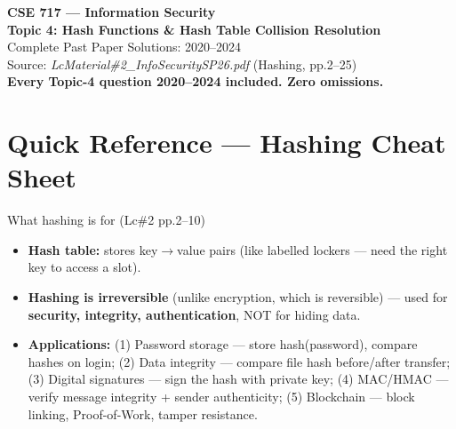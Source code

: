 \documentclass[12pt,a4paper]{article}
\begin{document}
\begin{center}
{\LARGE\bfseries\color{folblue} CSE 717 --- Information Security}\\[4pt]
{\large\bfseries Topic 4: Hash Functions \& Hash Table Collision Resolution}\\[2pt]
{\large Complete Past Paper Solutions: 2020--2024}\\[6pt]
{\normalsize Source: \textit{LcMaterial\#2\_InfoSecuritySP26.pdf} (Hashing, pp.2--25)}\\[2pt]
{\normalsize\color{darkred}\textbf{Every Topic-4 question 2020--2024 included. Zero omissions.}}
\end{center}

\tableofcontents
\newpage

\section*{Quick Reference --- Hashing Cheat Sheet}

\begin{keybox}{What hashing is for (Lc\#2 pp.2--10)}
\begin{itemize}[noitemsep]
  \item \textbf{Hash table:} stores key$\to$value pairs (like labelled lockers --- need the right key to access a slot).
  \item \textbf{Hashing is irreversible} (unlike encryption, which is reversible) --- used for \textbf{security, integrity, authentication}, NOT for hiding data.
  \item \textbf{Applications:} (1) Password storage --- store hash(password), compare hashes on login; (2) Data integrity --- compare file hash before/after transfer; (3) Digital signatures --- sign the hash with private key; (4) MAC/HMAC --- verify message integrity + sender authenticity; (5) Blockchain --- block linking, Proof-of-Work, tamper resistance.
\end{itemize}
\end{keybox}
\end{document}
